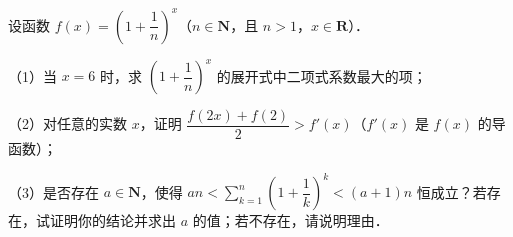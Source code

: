 \begin{question}
设函数 $f(x)=\left(1+\dfrac1n\right)^x$（$n\in\mathbf N$，且 $n>1$，$x\in\mathbf R$）．

（1）当 $x=6$ 时，求 $\left(1+\dfrac1n\right)^x$ 的展开式中二项式系数最大的项；

（2）对任意的实数 $x$，证明 $\dfrac{f(2x)+f(2)}{2}>f'(x)$（$f'(x)$ 是 $f(x)$ 的导函数）；

（3）是否存在 $a\in\mathbf N$，使得 $an<\sum\limits_{k=1}^{n}\left(1+\dfrac1k\right)^k<(a+1)n$ 恒成立？若存在，试证明你的结论并求出 $a$ 的值；若不存在，请说明理由．

\end{question}